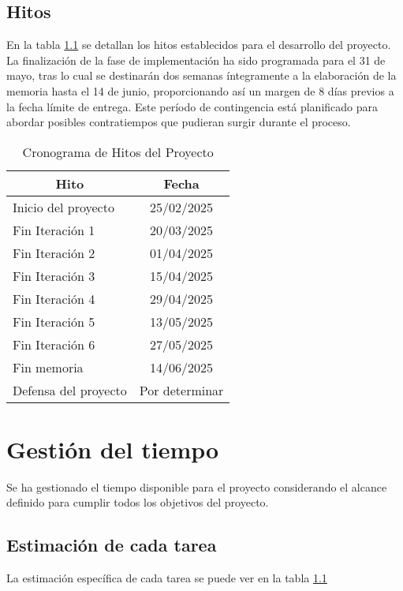 \subsection{Hitos}

En la tabla \ref{} se detallan los hitos establecidos para el desarrollo del proyecto. La finalización de la fase de implementación ha sido programada para el 31 de mayo, tras lo cual se destinarán dos semanas íntegramente a la elaboración de la memoria hasta el 14 de junio, proporcionando así un margen de 8 días previos a la fecha límite de entrega. Este período de contingencia está planificado para abordar posibles contratiempos que pudieran surgir durante el proceso.

\begin{table}[htbp]
\centering
\begin{tabular}{|l|c|}
\hline
\multicolumn{1}{|c|}{\textbf{Hito}} & \multicolumn{1}{c|}{\textbf{Fecha}} \\
\hline
Inicio del proyecto & 25/02/2025 \\
\hline
Fin Iteración 1 & 20/03/2025 \\
\hline
Fin Iteración 2 & 01/04/2025 \\
\hline
Fin Iteración 3 & 15/04/2025 \\
\hline
Fin Iteración 4 & 29/04/2025 \\
\hline
Fin Iteración 5 & 13/05/2025 \\
\hline
Fin Iteración 6 & 27/05/2025 \\
\hline
Fin memoria & 14/06/2025 \\
\hline
Defensa del proyecto & Por determinar \\
\hline
\end{tabular}
\caption{Cronograma de Hitos del Proyecto}
\label{tab:cronograma}
\end{table}

\section{Gestión del tiempo}
Se ha gestionado el tiempo disponible para el proyecto considerando el alcance definido para cumplir todos los objetivos del proyecto. 

\subsection{Estimación de cada tarea}
La estimación específica de cada tarea se puede ver en la tabla \ref{}

